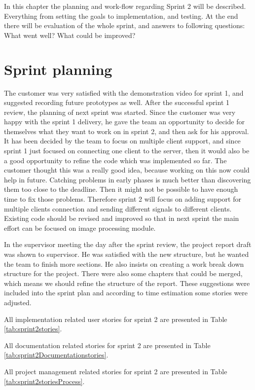 In this chapter the planning and work-flow regarding Sprint 2 will be described. 
Everything from setting the goals to implementation, and testing. At the end there will be evaluation of the  whole sprint, and answers to following questions: What went well? What could be improved? 

\section{Sprint planning}
The customer was very satisfied with the demonstration video for sprint 1, and suggested recording future prototypes as well. 
After the successful sprint 1 review, the planning of next sprint was started. 
Since the customer was very happy with the sprint 1 delivery, he gave the team an opportunity to decide for themselves what they want to work on in sprint 2, and then ask for his approval.
It has been decided by the team to focus on multiple client support, and since sprint 1 just focused on connecting one client to the server, then it would also be a good opportunity to refine the code which was implemented so far. 
The customer thought this was a really good idea, because working on this now could help in future. 
Catching problems in early phases is much better than discovering them too close to the deadline. 
Then it might not be possible to have enough time to fix those problems.
Therefore sprint 2 will focus on adding support for multiple clients connection and sending different signals to different clients. 
Existing code should be revised and improved so that in next sprint the main effort can be focused on image processing module.


In the supervisor meeting the day after the sprint review, the project report draft was shown to supervisor. 
He was satisfied with the new structure, but he wanted the team to finish more sections. He also insists on creating a work break down structure for the project. 
There were also some chapters that could be merged, which means we should refine the structure of the report. 
These suggestions were included into the sprint plan and according to time estimation some stories were adjusted.

All implementation related user stories for sprint 2 are presented in Table \ref{tab:sprint2stories}.

All documentation related stories for sprint 2 are presented in Table \ref{tab:sprint2Documentationstories}.

All project management related stories for sprint 2 are presented in Table \ref{tab:sprint2storiesProcess}.


